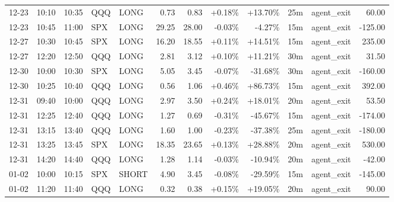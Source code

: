 \documentclass[11pt,a4paper]{article}
\begin{document}
\begin{center}
\begin{longtable}{>{\color{txtmain}}l l l l l r r r r r >{\color{txtmain}}l r}
12-23 & 10:10 & 10:35 & QQQ & LONG & 0.73 & 0.83 & \textcolor{wingreen}{+0.18\%} & \textcolor{wingreen}{+13.70\%} & 25m & agent\_exit & \textcolor{wingreen}{60.00} \\
12-23 & 10:45 & 11:00 & SPX & LONG & 29.25 & 28.00 & \textcolor{lossred}{-0.03\%} & \textcolor{lossred}{-4.27\%} & 15m & agent\_exit & \textcolor{lossred}{-125.00} \\
12-27 & 10:30 & 10:45 & SPX & LONG & 16.20 & 18.55 & \textcolor{wingreen}{+0.11\%} & \textcolor{wingreen}{+14.51\%} & 15m & agent\_exit & \textcolor{wingreen}{235.00} \\
12-27 & 12:20 & 12:50 & QQQ & LONG & 2.81 & 3.12 & \textcolor{wingreen}{+0.10\%} & \textcolor{wingreen}{+11.21\%} & 30m & agent\_exit & \textcolor{wingreen}{31.50} \\
12-30 & 10:00 & 10:30 & SPX & LONG & 5.05 & 3.45 & \textcolor{lossred}{-0.07\%} & \textcolor{lossred}{-31.68\%} & 30m & agent\_exit & \textcolor{lossred}{-160.00} \\
12-30 & 10:25 & 10:40 & QQQ & LONG & 0.56 & 1.06 & \textcolor{wingreen}{+0.46\%} & \textcolor{wingreen}{+86.73\%} & 15m & agent\_exit & \textcolor{wingreen}{392.00} \\
12-31 & 09:40 & 10:00 & QQQ & LONG & 2.97 & 3.50 & \textcolor{wingreen}{+0.24\%} & \textcolor{wingreen}{+18.01\%} & 20m & agent\_exit & \textcolor{wingreen}{53.50} \\
12-31 & 12:25 & 12:40 & QQQ & LONG & 1.27 & 0.69 & \textcolor{lossred}{-0.31\%} & \textcolor{lossred}{-45.67\%} & 15m & agent\_exit & \textcolor{lossred}{-174.00} \\
12-31 & 13:15 & 13:40 & QQQ & LONG & 1.60 & 1.00 & \textcolor{lossred}{-0.23\%} & \textcolor{lossred}{-37.38\%} & 25m & agent\_exit & \textcolor{lossred}{-180.00} \\
12-31 & 13:25 & 13:45 & SPX & LONG & 18.35 & 23.65 & \textcolor{wingreen}{+0.13\%} & \textcolor{wingreen}{+28.88\%} & 20m & agent\_exit & \textcolor{wingreen}{530.00} \\
12-31 & 14:20 & 14:40 & QQQ & LONG & 1.28 & 1.14 & \textcolor{lossred}{-0.03\%} & \textcolor{lossred}{-10.94\%} & 20m & agent\_exit & \textcolor{lossred}{-42.00} \\
01-02 & 10:00 & 10:15 & SPX & SHORT & 4.90 & 3.45 & \textcolor{lossred}{-0.08\%} & \textcolor{lossred}{-29.59\%} & 15m & agent\_exit & \textcolor{lossred}{-145.00} \\
01-02 & 11:20 & 11:40 & QQQ & LONG & 0.32 & 0.38 & \textcolor{wingreen}{+0.15\%} & \textcolor{wingreen}{+19.05\%} & 20m & agent\_exit & \textcolor{wingreen}{90.00} \\

\end{longtable}
\end{center}
\end{document}
